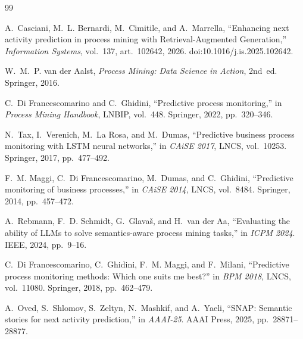 \documentclass[a4paper,12pt,oneside]{report}
\begin{document}
\clearpage
{}
\setcounter{page}{1}











\clearpage
{}
\begingroup
{}
\small
\begin{thebibliography}{99}
\setlength{\itemsep}{3pt}

 A.~Casciani, M.~L. Bernardi, M.~Cimitile, and A.~Marrella, ``Enhancing next activity prediction in process mining with Retrieval-Augmented Generation,'' \textit{Information Systems}, vol.~137, art.~102642, 2026. doi:10.1016/j.is.2025.102642.

 W.~M.~P. van der Aalst, \textit{Process Mining: Data Science in Action}, 2nd~ed. Springer, 2016.

 C.~Di Francescomarino and C.~Ghidini, ``Predictive process monitoring,'' in \textit{Process Mining Handbook}, LNBIP, vol.~448. Springer, 2022, pp.~320--346.

 N.~Tax, I.~Verenich, M.~La Rosa, and M.~Dumas, ``Predictive business process monitoring with LSTM neural networks,'' in \textit{CAiSE 2017}, LNCS, vol.~10253. Springer, 2017, pp.~477--492.

 F.~M. Maggi, C.~Di Francescomarino, M.~Dumas, and C.~Ghidini, ``Predictive monitoring of business processes,'' in \textit{CAiSE 2014}, LNCS, vol.~8484. Springer, 2014, pp.~457--472.

 A.~Rebmann, F.~D. Schmidt, G.~Glavaš, and H.~van der Aa, ``Evaluating the ability of LLMs to solve semantics-aware process mining tasks,'' in \textit{ICPM 2024}. IEEE, 2024, pp.~9--16.

 C.~Di Francescomarino, C.~Ghidini, F.~M. Maggi, and F.~Milani, ``Predictive process monitoring methods: Which one suits me best?'' in \textit{BPM 2018}, LNCS, vol.~11080. Springer, 2018, pp.~462--479.

 A.~Oved, S.~Shlomov, S.~Zeltyn, N.~Mashkif, and A.~Yaeli, ``SNAP: Semantic stories for next activity prediction,'' in \textit{AAAI-25}. AAAI Press, 2025, pp.~28871--28877.


\end{thebibliography}
\end{document}
